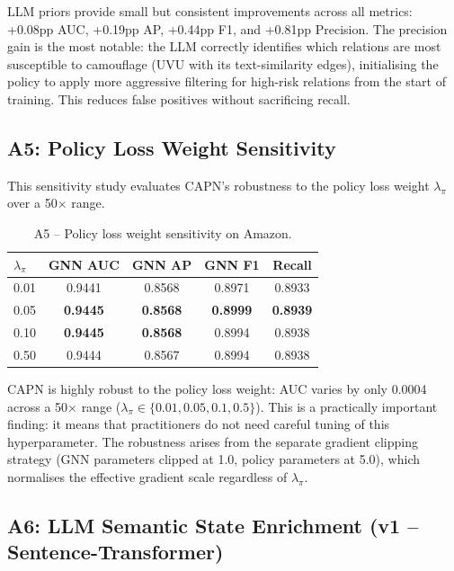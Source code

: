 \noindent
LLM priors provide small but consistent improvements across all metrics: +0.08pp AUC, +0.19pp AP, +0.44pp F1, and +0.81pp Precision. The precision gain is the most notable: the LLM correctly identifies which relations are most susceptible to camouflage (UVU with its text-similarity edges), initialising the policy to apply more aggressive filtering for high-risk relations from the start of training. This reduces false positives without sacrificing recall.

\subsection{A5: Policy Loss Weight Sensitivity}

This sensitivity study evaluates CAPN's robustness to the policy loss weight $\lambda_\pi$ over a 50$\times$ range.

\begin{table}[h!]
\centering
\begin{tabular}{lcccc}
\toprule
\textbf{$\lambda_\pi$} & \textbf{GNN AUC} & \textbf{GNN AP} & \textbf{GNN F1} & \textbf{Recall} \\
\midrule
0.01 & 0.9441 & 0.8568 & 0.8971 & 0.8933 \\
0.05 & \textbf{0.9445} & \textbf{0.8568} & \textbf{0.8999} & \textbf{0.8939} \\
0.10 & \textbf{0.9445} & \textbf{0.8568} & 0.8994 & 0.8938 \\
0.50 & 0.9444 & 0.8567 & 0.8994 & 0.8938 \\
\bottomrule
\end{tabular}
\caption{A5 -- Policy loss weight sensitivity on Amazon.}
\label{tab:a5-lambda}
\end{table}

\noindent
CAPN is highly robust to the policy loss weight: AUC varies by only 0.0004 across a 50$\times$ range ($\lambda_\pi \in \{0.01, 0.05, 0.1, 0.5\}$). This is a practically important finding: it means that practitioners do not need careful tuning of this hyperparameter. The robustness arises from the separate gradient clipping strategy (GNN parameters clipped at 1.0, policy parameters at 5.0), which normalises the effective gradient scale regardless of $\lambda_\pi$.

\subsection{A6: LLM Semantic State Enrichment (v1 -- Sentence-Transformer)}

